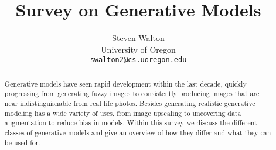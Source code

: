 \documentclass[final]{cvpr}
\begin{document}
\title{Survey on Generative Models}

\author{Steven Walton\\
University of Oregon\\

{\tt\small swalton2@cs.uoregon.edu}
}

\maketitle


\begin{abstract}
Generative models have seen rapid development within the last decade, quickly
progressing from generating fuzzy images to consistently producing images that
are near indistinguishable from real life photos. Besides generating realistic
generative modeling has a wide variety of uses, from image upscaling to
uncovering data augmentation to reduce bias in models. Within this survey we
discuss the different classes of generative models and give an overview of how
they differ and what they can be used for.
\end{abstract}








{\small


}
\end{document}
